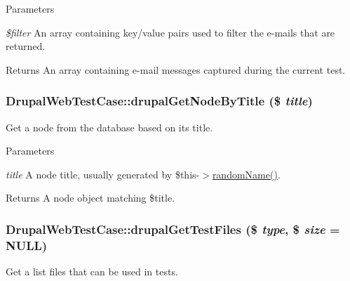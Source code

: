 \begin{DoxyParams}{Parameters}
\item[{\em \$filter}]An array containing key/value pairs used to filter the e-\/mails that are returned. \end{DoxyParams}
\begin{DoxyReturn}{Returns}
An array containing e-\/mail messages captured during the current test. 
\end{DoxyReturn}
\hypertarget{class_drupal_web_test_case_ae3312c84795861f1bb35c226ef700903}{
\subsubsection[{drupalGetNodeByTitle}]{\setlength{\rightskip}{0pt plus 5cm}DrupalWebTestCase::drupalGetNodeByTitle (\$ {\em title})}}
\label{class_drupal_web_test_case_ae3312c84795861f1bb35c226ef700903}
Get a node from the database based on its title.


\begin{DoxyParams}{Parameters}
\item[{\em title}]A node title, usually generated by \$this-\/$>$\hyperlink{class_drupal_test_case_ab1137ec76434cdd38ec267977ba153d5}{randomName()}.\end{DoxyParams}
\begin{DoxyReturn}{Returns}
A node object matching \$title. 
\end{DoxyReturn}
\hypertarget{class_drupal_web_test_case_ad1439acbfb7b5cd34e851d49106ba92f}{
\subsubsection[{drupalGetTestFiles}]{\setlength{\rightskip}{0pt plus 5cm}DrupalWebTestCase::drupalGetTestFiles (\$ {\em type}, \/  \$ {\em size} = {\ttfamily NULL})}}
\label{class_drupal_web_test_case_ad1439acbfb7b5cd34e851d49106ba92f}
Get a list files that can be used in tests.


